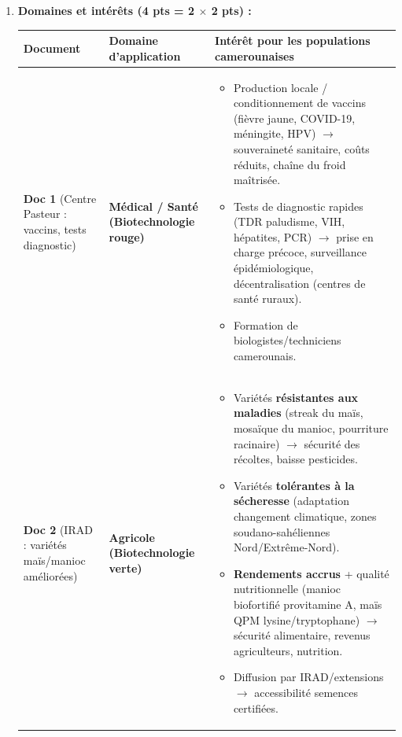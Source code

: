 \documentclass[11pt]{article}
\begin{document}
\begin{corrige}
\begin{enumerate}
\item \textbf{Domaines et intérêts (4 pts = 2 $\times$ 2 pts) :}
\begin{center}
\begin{tabularx}{\linewidth}{|l|X|X|}\hline
\textbf{Document} & \textbf{Domaine d'application} & \textbf{Intérêt pour les populations camerounaises} \\ \hline
\textbf{Doc 1} (Centre Pasteur : vaccins, tests diagnostic) & \textbf{Médical / Santé (Biotechnologie rouge)} & \begin{itemize}\item Production locale / conditionnement de vaccins (fièvre jaune, COVID-19, méningite, HPV) $\rightarrow$ souveraineté sanitaire, coûts réduits, chaîne du froid maîtrisée.\item Tests de diagnostic rapides (TDR paludisme, VIH, hépatites, PCR) $\rightarrow$ prise en charge précoce, surveillance épidémiologique, décentralisation (centres de santé ruraux).\item Formation de biologistes/techniciens camerounais.\end{itemize} \\ \hline
\textbf{Doc 2} (IRAD : variétés maïs/manioc améliorées) & \textbf{Agricole (Biotechnologie verte)} & \begin{itemize}\item Variétés \textbf{résistantes aux maladies} (streak du maïs, mosaïque du manioc, pourriture racinaire) $\rightarrow$ sécurité des récoltes, baisse pesticides.\item Variétés \textbf{tolérantes à la sécheresse} (adaptation changement climatique, zones soudano-sahéliennes Nord/Extrême-Nord).\item \textbf{Rendements accrus} + qualité nutritionnelle (manioc biofortifié provitamine A, maïs QPM lysine/tryptophane) $\rightarrow$ sécurité alimentaire, revenus agriculteurs, nutrition.\item Diffusion par IRAD/extensions $\rightarrow$ accessibilité semences certifiées.\end{itemize} \\ \hline
\end{tabularx}
\end{center}


\end{enumerate}
\end{corrige}
\end{document}
